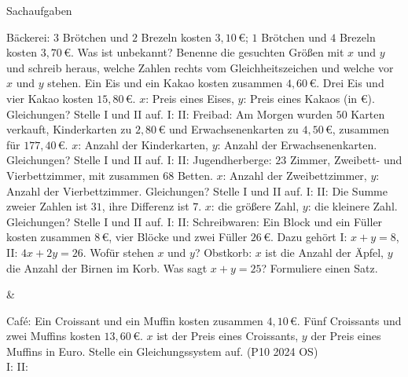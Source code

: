 \setcounter{aufgabe}{22}

\begin{aufgabe}{Sachaufgaben}
\begin{teile}
\teil Bäckerei: $3$ Brötchen und $2$ Brezeln kosten $3{,}10\,€$; $1$ Brötchen und $4$ Brezeln kosten $3{,}70\,€$. Was ist unbekannt? Benenne die gesuchten Größen mit $x$ und $y$ und schreib heraus, welche Zahlen rechts vom Gleichheitszeichen und welche vor $x$ und $y$ stehen.
\teil Ein Eis und ein Kakao kosten zusammen $4{,}60\,€$. Drei Eis und vier Kakao kosten $15{,}80\,€$. $x$: Preis eines Eises, $y$: Preis eines Kakaos (in €). Gleichungen? Stelle I und II auf. I: \leerfeld \quad II: \leerfeld
\teil Freibad: Am Morgen wurden $50$ Karten verkauft, Kinderkarten zu $2{,}80\,€$ und Erwachsenenkarten zu $4{,}50\,€$, zusammen für $177{,}40\,€$. $x$: Anzahl der Kinderkarten, $y$: Anzahl der Erwachsenenkarten. Gleichungen? Stelle I und II auf. I: \leerfeld \quad II: \leerfeld
\teil Jugendherberge: $23$ Zimmer, Zweibett- und Vierbettzimmer, mit zusammen $68$ Betten. $x$: Anzahl der Zweibettzimmer, $y$: Anzahl der Vierbettzimmer. Gleichungen? Stelle I und II auf. I: \leerfeld \quad II: \leerfeld
\teil Die Summe zweier Zahlen ist $31$, ihre Differenz ist $7$. $x$: die größere Zahl, $y$: die kleinere Zahl. Gleichungen? Stelle I und II auf. I: \leerfeld \quad II: \leerfeld
\teil Schreibwaren: Ein Block und ein Füller kosten zusammen $8\,€$, vier Blöcke und zwei Füller $26\,€$. Dazu gehört I: $x + y = 8$, II: $4x + 2y = 26$. Wofür stehen $x$ und $y$?
\teil Obstkorb: $x$ ist die Anzahl der Äpfel, $y$ die Anzahl der Birnen im Korb. Was sagt $x + y = 25$? Formuliere einen Satz.
\end{teile}
\begin{gleichungsraster}[2]
 &
\end{gleichungsraster}
\begin{teile}
\teil Café: Ein Croissant und ein Muffin kosten zusammen $4{,}10\,€$. Fünf Croissants und zwei Muffins kosten $13{,}60\,€$. $x$ ist der Preis eines Croissants, $y$ der Preis eines Muffins in Euro. Stelle ein Gleichungssystem auf. \hfill (P10 2024 OS) \\ I: \leerfeld \quad II: \leerfeld
\end{teile}
\end{aufgabe}

